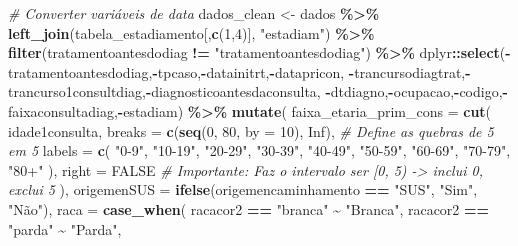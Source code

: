 \documentclass[
]{article}
\newenvironment{Shaded}{\begin{snugshade}}{\end{snugshade}}
\newcommand{\AttributeTok}[1]{\textcolor[rgb]{0.13,0.29,0.53}{#1}}
\newcommand{\CommentTok}[1]{\textcolor[rgb]{0.56,0.35,0.01}{\textit{#1}}}
\newcommand{\ConstantTok}[1]{\textcolor[rgb]{0.56,0.35,0.01}{#1}}
\newcommand{\DecValTok}[1]{\textcolor[rgb]{0.00,0.00,0.81}{#1}}
\newcommand{\FunctionTok}[1]{\textcolor[rgb]{0.13,0.29,0.53}{\textbf{#1}}}
\newcommand{\NormalTok}[1]{#1}
\newcommand{\OtherTok}[1]{\textcolor[rgb]{0.56,0.35,0.01}{#1}}
\newcommand{\SpecialCharTok}[1]{\textcolor[rgb]{0.81,0.36,0.00}{\textbf{#1}}}
\newcommand{\StringTok}[1]{\textcolor[rgb]{0.31,0.60,0.02}{#1}}
\begin{document}
\begin{Shaded}
\begin{Highlighting}[]
\CommentTok{\# Converter variáveis de data}
\NormalTok{dados\_clean }\OtherTok{\textless{}{-}}\NormalTok{ dados }\SpecialCharTok{\%\textgreater{}\%}
  \FunctionTok{left\_join}\NormalTok{(tabela\_estadiamento[,}\FunctionTok{c}\NormalTok{(}\DecValTok{1}\NormalTok{,}\DecValTok{4}\NormalTok{)], }\StringTok{"estadiam"}\NormalTok{) }\SpecialCharTok{\%\textgreater{}\%} 
  \FunctionTok{filter}\NormalTok{(tratamentoantesdodiag }\SpecialCharTok{!=} \StringTok{"tratamentoantesdodiag"}\NormalTok{) }\SpecialCharTok{\%\textgreater{}\%}
\NormalTok{  dplyr}\SpecialCharTok{::}\FunctionTok{select}\NormalTok{(}\SpecialCharTok{{-}}\NormalTok{tratamentoantesdodiag,}\SpecialCharTok{{-}}\NormalTok{tpcaso,}\SpecialCharTok{{-}}\NormalTok{datainitrt,}\SpecialCharTok{{-}}\NormalTok{datapricon,}
         \SpecialCharTok{{-}}\NormalTok{trancursodiagtrat,}\SpecialCharTok{{-}}\NormalTok{trancurso1consultdiag,}\SpecialCharTok{{-}}\NormalTok{diagnosticoantesdaconsulta,}
         \SpecialCharTok{{-}}\NormalTok{dtdiagno,}\SpecialCharTok{{-}}\NormalTok{ocupacao,}\SpecialCharTok{{-}}\NormalTok{codigo,}\SpecialCharTok{{-}}\NormalTok{faixaconsultadiag,}\SpecialCharTok{{-}}\NormalTok{estadiam) }\SpecialCharTok{\%\textgreater{}\%} 
  \FunctionTok{mutate}\NormalTok{(}
    \AttributeTok{faixa\_etaria\_prim\_cons =} \FunctionTok{cut}\NormalTok{(}
\NormalTok{      idade1consulta,}
      \AttributeTok{breaks =} \FunctionTok{c}\NormalTok{(}\FunctionTok{seq}\NormalTok{(}\DecValTok{0}\NormalTok{, }\DecValTok{80}\NormalTok{, }\AttributeTok{by =} \DecValTok{10}\NormalTok{), }\ConstantTok{Inf}\NormalTok{), }\CommentTok{\# Define as quebras de 5 em 5}
      \AttributeTok{labels =} \FunctionTok{c}\NormalTok{(}
        \StringTok{"0{-}9"}\NormalTok{, }\StringTok{"10{-}19"}\NormalTok{, }\StringTok{"20{-}29"}\NormalTok{, }\StringTok{"30{-}39"}\NormalTok{,}
        \StringTok{"40{-}49"}\NormalTok{, }\StringTok{"50{-}59"}\NormalTok{, }\StringTok{"60{-}69"}\NormalTok{, }\StringTok{"70{-}79"}\NormalTok{,}
        \StringTok{"80+"}
\NormalTok{      ),}
      \AttributeTok{right =} \ConstantTok{FALSE} \CommentTok{\# Importante: Faz o intervalo ser [0, 5) {-}\textgreater{} inclui 0, exclui 5}
\NormalTok{    ),}
    \AttributeTok{origemenSUS =} \FunctionTok{ifelse}\NormalTok{(origemencaminhamento }\SpecialCharTok{==} \StringTok{"SUS"}\NormalTok{, }\StringTok{"Sim"}\NormalTok{, }\StringTok{"Não"}\NormalTok{),}
    \AttributeTok{raca =} \FunctionTok{case\_when}\NormalTok{(}
\NormalTok{      racacor2 }\SpecialCharTok{==} \StringTok{"branca"} \SpecialCharTok{\textasciitilde{}} \StringTok{"Branca"}\NormalTok{,}
\NormalTok{      racacor2 }\SpecialCharTok{==} \StringTok{"parda"} \SpecialCharTok{\textasciitilde{}} \StringTok{"Parda"}\NormalTok{,}

\end{Highlighting}
\end{Shaded}
\end{document}

